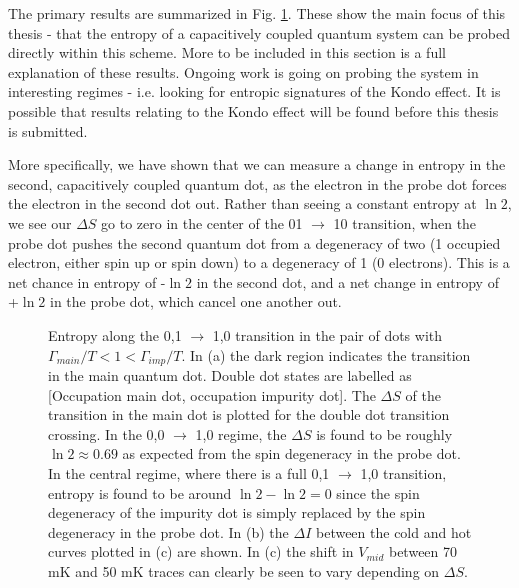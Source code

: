 The primary results are summarized in Fig. \ref{fig:results1}. These show the main focus of this thesis - that the entropy of a capacitively coupled quantum system can be probed directly within this scheme. More to be included in this section is a full explanation of these results. Ongoing work is going on probing the system in interesting regimes - i.e. looking for entropic signatures of the Kondo effect. It is possible that results relating to the Kondo effect will be found before this thesis is submitted. 

More specifically, we have shown that we can measure a change in entropy in the second, capacitively coupled quantum dot, as the electron in the probe dot forces the electron in the second dot out. Rather than seeing a constant entropy at $\ln 2$, we see our $\Delta S$ go to zero in the center of the 01 $\to$ 10 transition, when the probe dot pushes the second quantum dot from a degeneracy of two (1 occupied electron, either spin up or spin down) to a degeneracy of 1 (0 electrons). This is a net chance in entropy of -$\ln 2$ in the second dot, and a net change in entropy of +$\ln 2$ in the probe dot, which cancel one another out.
\begin{figure}[h]
\centering
{}
\caption{Entropy along the 0,1 $\to$ 1,0 transition in the pair of dots with $\Gamma_{main}/T < 1 < \Gamma_{imp}/T$. In (a) the dark region indicates the transition in the main quantum dot. Double dot states are labelled as [Occupation main dot, occupation impurity dot]. The $\Delta S$ of the transition in the main dot is plotted for the double dot transition crossing. In the 0,0 $\to$ 1,0 regime, the $\Delta S$ is found to be roughly $\ln 2 \approx 0.69$ as expected from the spin degeneracy in the probe dot. In the central regime, where there is a full 0,1 $\to$ 1,0 transition, entropy is found to be around $\ln 2 - \ln2 = 0$ since the spin degeneracy of the impurity dot is simply replaced by the spin degeneracy in the probe dot. In (b) the $\Delta I$ between the cold and hot curves plotted in (c) are shown. In (c) the shift in $V_{mid}$ between 70 mK and 50 mK traces can clearly be seen to vary depending on $\Delta S$.}

\label{fig:results1}       %
\end{figure}

